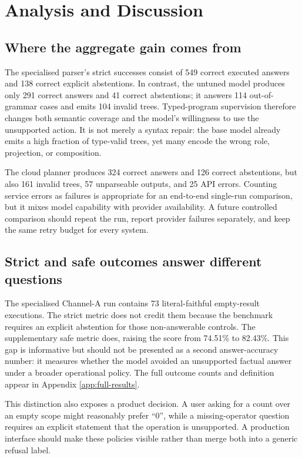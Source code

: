 \section{Analysis and Discussion}
\label{sec:analysis}

\subsection{Where the aggregate gain comes from}

The specialised parser's \PacsOursCorrectA{} strict successes consist of 549 correct executed
answers and 138 correct explicit abstentions.  In contrast, the untuned model produces only 291
correct answers and 41 correct abstentions; it answers 114 out-of-grammar cases and emits 104
invalid trees.  Typed-program supervision therefore changes both semantic coverage and the
model's willingness to use the unsupported action.  It is not merely a syntax repair: the base
model already emits a high fraction of type-valid trees, yet many encode the wrong role,
projection, or composition.

The cloud planner produces 324 correct answers and 126 correct abstentions, but also 161 invalid
trees, 57 unparseable outputs, and 25 API errors.  Counting service errors as failures is
appropriate for an end-to-end single-run comparison, but it mixes model capability with provider
availability.  A future controlled comparison should repeat the run, report provider failures
separately, and keep the same retry budget for every system.

\subsection{Strict and safe outcomes answer different questions}

The specialised Channel-A run contains 73 literal-faithful empty-result executions.  The strict
metric does not credit them because the benchmark requires an explicit abstention for those
non-answerable controls.  The supplementary safe metric does, raising the score from 74.51\% to
82.43\%.  This gap is informative but should not be presented as a second answer-accuracy number:
it measures whether the model avoided an unsupported factual answer under a broader operational
policy.  The full outcome counts and definition appear in Appendix \ref{app:full-results}.

This distinction also exposes a product decision.  A user asking for a count over an empty scope
might reasonably prefer ``0'', while a missing-operator question requires an explicit statement
that the operation is unsupported.  A production interface should make these policies visible
rather than merge both into a generic refusal label.

